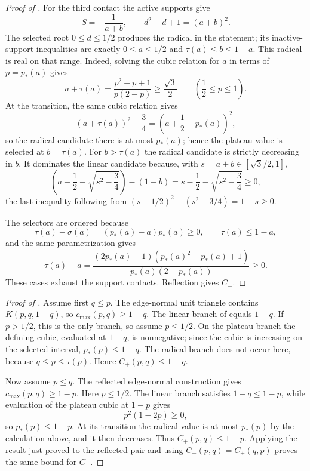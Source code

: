 \begin{proof}[Proof of ]
For the third contact the active supports give
\[
 S=-\frac1{a+b},\qquad d^2-d+1=(a+b)^2.
\]
The selected root $0\le d\le1/2$ produces the radical in the statement; its
inactive-support inequalities are exactly
$0\le a\le1/2$ and $\tau(a)\le b\le1-a$.  This radical is real on that
range.  Indeed, solving the cubic relation for $a$ in terms of
$p=p_*(a)$ gives
\[
 a+\tau(a)=\frac{p^2-p+1}{p(2-p)}\ge\frac{\sqrt3}{2}
 \qquad\left(\frac12\le p\le1\right).
\]
At the transition, the same cubic relation gives
\[
 (a+\tau(a))^2-\frac34
 =\left(a+\frac12-p_*(a)\right)^2,
\]
so the radical candidate there is at most $p_*(a)$; hence the plateau value
is selected at $b=\tau(a)$.  For $b>\tau(a)$ the radical candidate is
strictly decreasing in $b$.  It dominates the linear candidate because,
with $s=a+b\in[\sqrt3/2,1]$,
\[
 \left(a+\frac12-\sqrt{s^2-\frac34}\right)-(1-b)
 =s-\frac12-\sqrt{s^2-\frac34}\ge0,
\]
the last inequality following from
$(s-1/2)^2-(s^2-3/4)=1-s\ge0$.

The selectors are ordered because
\[
 \tau(a)-\sigma(a)=(p_*(a)-a)p_*(a)\ge0,
 \qquad \tau(a)\le1-a,
\]
and the same parametrization gives
\[
 \tau(a)-a
 =\frac{(2p_*(a)-1)(p_*(a)^2-p_*(a)+1)}
 {p_*(a)(2-p_*(a))}\ge0.
\]
These cases exhaust the support contacts.  Reflection gives $C_-$.
\end{proof}

\begin{proof}[Proof of ]
Assume first $q\le p$.  The edge-normal unit triangle contains
$K(p,q,1-q)$, so $c_{\max}(p,q)\ge1-q$.  The linear branch of
 equals $1-q$.  If $p>1/2$, this is the
only branch, so assume $p\le1/2$.  On the plateau branch
the defining cubic, evaluated at $1-q$, is nonnegative; since the cubic is
increasing on the selected interval, $p_*(p)\le1-q$.  The radical branch
does not occur here, because $q\le p\le\tau(p)$.  Hence
$C_+(p,q)\le1-q$.

Now assume $p\le q$.  The reflected edge-normal construction gives
$c_{\max}(p,q)\ge1-p$.  Here $p\le1/2$.  The linear branch satisfies
$1-q\le1-p$, while evaluation of the plateau cubic at $1-p$ gives
\[
 p^2(1-2p)\ge0,
\]
so $p_*(p)\le1-p$.  At its transition the radical value is at most
$p_*(p)$ by the calculation above, and it then decreases.  Thus
$C_+(p,q)\le1-p$.  Applying the result just proved to the reflected
pair and using $C_-(p,q)=C_+(q,p)$ proves the same bound for $C_-$.
\end{proof}

